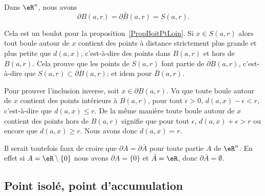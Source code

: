 
\begin{example}
	Dans \( \eR^n\), nous avons
	\begin{equation}
		\partial B(a,r)=\partial\bar B(a,r)=S(a,r).
	\end{equation}

	Cela est un boulot pour la proposition~\ref{PropBoitPtLoin}. Si \( x\in S(a,r)\) alors tout boule autour de \( x\) contient des points à distance strictement plus grande et plus petite que \( d(a,x)\), c'est-à-dire des points dans \( B(a,r)\) et hors de \( B(a,r)\). Cela prouve que les points de \( S(a,r)\) font partie de \( \partial B(a,r)\), c'est-à-dire que \( S(a,r)\subset \partial B(a,r)\); et idem pour \( \bar B(a,r)\).

	Pour prouver l'inclusion inverse, soit \( x\in \partial B(a,r)\). Vu que toute boule autour de \( x\) contient des points intérieurs à \( B(a,r)\), pour tout \( \epsilon>0\), \( d(a,x)-\epsilon< r \), c'est-à-dire que \( d(a,x)\leq r\). De la même manière toute boule autour de \( x\) contient des points hors de \( B(a,r)\) signifie que pour tout \( \epsilon\), \( d(a,x)+\epsilon>r\) ou encore que \( d(a,x)\geq r\). Nous avons donc \( d(a,x)=r\).
\end{example}

\begin{remark}
	Il serait toutefois faux de croire que \( \partial A=\partial \bar A\) pour toute partie \( A\) de \( \eR^n\). En effet si \( A=\eR\setminus\{ 0 \}\) nous avons \( \partial A=\{ 0 \}\) et \( \bar A=\eR\), donc \( \partial \bar A=\emptyset\).
\end{remark}

\subsection{Point isolé, point d'accumulation}

